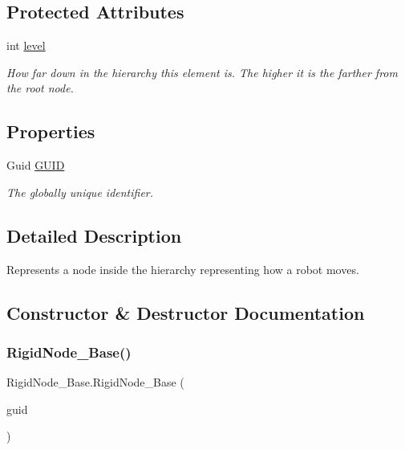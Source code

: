 \subsection*{Protected Attributes}
\begin{DoxyCompactItemize}
\item 
int \hyperlink{class_rigid_node___base_a762f5fd81893ce03a8c9f28038f7acbe}{level}
\begin{DoxyCompactList}\small\item\em How far down in the hierarchy this element is. The higher it is the farther from the root node. \end{DoxyCompactList}\end{DoxyCompactItemize}
\subsection*{Properties}
\begin{DoxyCompactItemize}
\item 
Guid \hyperlink{class_rigid_node___base_aa4562673f4d55888f3dfa594b62bf7d1}{G\+U\+ID}
\begin{DoxyCompactList}\small\item\em The globally unique identifier. \end{DoxyCompactList}\end{DoxyCompactItemize}


\subsection{Detailed Description}
Represents a node inside the hierarchy representing how a robot moves. 



\subsection{Constructor \& Destructor Documentation}
\mbox{\label{class_rigid_node___base_ad717bbf1b9a1b28d24dbdf7242cf4a1b}} 
\subsubsection{\texorpdfstring{Rigid\+Node\+\_\+\+Base()}{RigidNode\_Base()}}
{\footnotesize\ttfamily Rigid\+Node\+\_\+\+Base.\+Rigid\+Node\+\_\+\+Base (\begin{DoxyParamCaption}\item[{Guid}]{guid }\end{DoxyParamCaption})}



